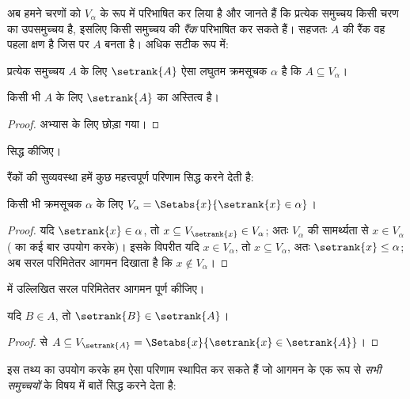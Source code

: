 \documentclass[../../../include/open-logic-section]{subfiles}
\begin{document}

अब हमने चरणों को $V_\alpha$ के रूप में परिभाषित कर लिया है और जानते हैं कि
प्रत्येक समुच्चय किसी चरण का उपसमुच्चय है, इसलिए किसी समुच्चय की \emph{रैंक}
परिभाषित कर सकते हैं। सहजतः $A$ की रैंक वह पहला क्षण है जिस पर $A$ बनता
है। अधिक सटीक रूप में:

\begin{defn}
प्रत्येक समुच्चय $A$ के लिए $\setrank{A}$ ऐसा लघुतम क्रमसूचक $\alpha$ है
कि $A \subseteq V_\alpha$।
\end{defn}
\begin{prop}
	किसी भी $A$ के लिए $\setrank{A}$ का अस्तित्व है।
\end{prop}
\begin{proof}
	अभ्यास के लिए छोड़ा गया।
\end{proof}
\begin{prob}
	 सिद्ध कीजिए।
\end{prob}
\noindent 
रैंकों की सुव्यवस्था हमें कुछ महत्त्वपूर्ण परिणाम सिद्ध करने देती है:
\begin{prop}
किसी भी क्रमसूचक $\alpha$ के लिए
$V_\alpha = \Setabs{x}{\setrank{x} \in \alpha}$।
\end{prop}

\begin{proof}
यदि $\setrank{x} \in \alpha$, तो
$x \subseteq V_{\setrank{x}} \in V_\alpha$; अतः $V_\alpha$ की सामर्थ्यता
से $x \in V_\alpha$ ( का कई बार
उपयोग करके)। इसके विपरीत यदि $x \in V_\alpha$, तो
$x \subseteq V_\alpha$, अतः $\setrank{x} \leq \alpha$; अब सरल परिमितेतर
आगमन दिखाता है कि $x \notin V_\alpha$।
\end{proof}
\begin{prob}
	 में उल्लिखित सरल परिमितेतर
	आगमन पूर्ण कीजिए।
\end{prob}

\begin{prop}
यदि $B \in A$, तो $\setrank{B} \in \setrank{A}$।
\end{prop}

\begin{proof}
 से
$A \subseteq V_{\setrank{A}} = \Setabs{x}{\setrank{x} \in
\setrank{A}}$।
\end{proof}
\noindent
इस तथ्य का उपयोग करके हम ऐसा परिणाम स्थापित कर सकते हैं जो आगमन के एक रूप
से \emph{सभी समुच्चयों} के विषय में बातें सिद्ध करने देता है:
\end{document}
